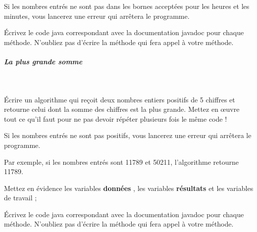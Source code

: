 \documentclass[11pt,a4paper]{article}
\begin{document}
            \par
        
          Si les nombres entr\'es ne sont pas dans les bornes accept\'ees pour les heures et les minutes, vous lancerez une erreur qui arr\^etera le programme.
        
            \par
        
          \'Ecrivez le code java correspondant avec la documentation javadoc pour chaque m\'ethode. 
          N'oubliez pas d'\'ecrire la m\'ethode \verb@main@ qui fera appel \`a votre m\'ethode.
        
            \par
        
			
		\subparagraph{La plus grande somme} 
		
					\textcolor{white}{.} \par
				
          \'Ecrire un algorithme qui re\c coit deux nombres entiers positifs de 5 chiffres et retourne celui dont la somme des chiffres est la plus grande.
          Mettez en œuvre tout ce qu'il faut pour ne pas devoir r\'ep\'eter plusieurs fois le m\^eme code !
        
            \par
        
          Si les nombres entr\'es ne sont pas positifs, vous lancerez une erreur qui arr\^etera le programme.
        
            \par
        
          Par exemple, si les nombres entr\'es sont 11789 et 50211, l'algorithme retourne 11789.
        
            \par
        
          Mettez en \'evidence les variables \textbf{\guillemotleft  donn\'ees \guillemotright }, 
          les variables \textbf{\guillemotleft  r\'esultats \guillemotright } et les variables de travail ;
        
            \par
        
          \'Ecrivez le code java correspondant avec la documentation javadoc pour chaque m\'ethode. 
          N'oubliez pas d'\'ecrire la m\'ethode \verb@main@ qui fera appel \`a votre m\'ethode.
        
            \par
        
\end{document}
